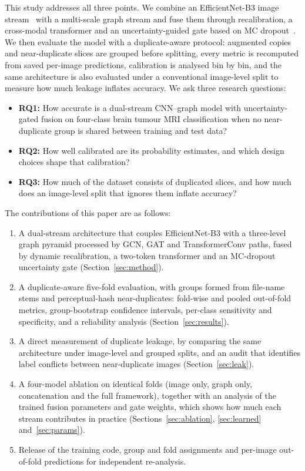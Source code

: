 \documentclass[journal,onecolumn]{IEEEtran}
\begin{document}
This study addresses all three points. We combine an EfficientNet-B3 image stream~\cite{tan2019efficientnet} with a multi-scale graph stream and fuse them through recalibration, a cross-modal transformer and an uncertainty-guided gate based on MC dropout~\cite{gal2016dropout}. We then evaluate the model with a duplicate-aware protocol: augmented copies and near-duplicate slices are grouped before splitting, every metric is recomputed from saved per-image predictions, calibration is analysed bin by bin, and the same architecture is also evaluated under a conventional image-level split to measure how much leakage inflates accuracy. We ask three research questions:
\begin{itemize}
\item \textbf{RQ1:} How accurate is a dual-stream CNN--graph model with uncertainty-gated fusion on four-class brain tumour MRI classification when no near-duplicate group is shared between training and test data?
\item \textbf{RQ2:} How well calibrated are its probability estimates, and which design choices shape that calibration?
\item \textbf{RQ3:} How much of the dataset consists of duplicated slices, and how much does an image-level split that ignores them inflate accuracy?
\end{itemize}

The contributions of this paper are as follows:
\begin{enumerate}
\item A dual-stream architecture that couples EfficientNet-B3 with a three-level graph pyramid processed by GCN, GAT and TransformerConv paths, fused by dynamic recalibration, a two-token transformer and an MC-dropout uncertainty gate (Section~\ref{sec:method}).
\item A duplicate-aware five-fold evaluation, with groups formed from file-name stems and perceptual-hash near-duplicates: fold-wise and pooled out-of-fold metrics, group-bootstrap confidence intervals, per-class sensitivity and specificity, and a reliability analysis (Section~\ref{sec:results}).
\item A direct measurement of duplicate leakage, by comparing the same architecture under image-level and grouped splits, and an audit that identifies label conflicts between near-duplicate images (Section~\ref{sec:leak}).
\item A four-model ablation on identical folds (image only, graph only, concatenation and the full framework), together with an analysis of the trained fusion parameters and gate weights, which shows how much each stream contributes in practice (Sections~\ref{sec:ablation}, \ref{sec:learned} and~\ref{sec:params}).
\item Release of the training code, group and fold assignments and per-image out-of-fold predictions for independent re-analysis.
\end{enumerate}
\end{document}
